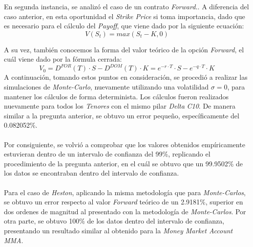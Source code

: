 \noindent En segunda instancia, se analizó el caso de un contrato \textit{Forward.}. A diferencia del caso anterior, en esta oportunidad el \textit{Strike Price} si toma importancia, dado que es necesario para el cálculo del \textit{Payoff}, que viene dado por la siguiente ecuación:
\begin{equation}
    V(S_t)=max(S_t-K,0)
\end{equation}

\noindent A su vez, también conocemos la forma del valor teórico de la opción \textit{Forward}, el cuál viene dado por la fórmula cerrada:
\begin{equation}
    V_0=D^{FOR}(T)\cdot S- D^{DOM}(T)\cdot K = e^{-r\cdot T}\cdot S- e^{-q\cdot T}\cdot K
\end{equation}
\noindent A continuación, tomando estos puntos en consideración, se procedió a realizar las simulaciones de \textit{Monte-Carlo}, nuevamente utilizando una volatilidad $\sigma=0$, para mantener los cálculos de forma determinista. Los cálculos fueron realizados nuevamente para todos los \textit{Tenores} con el mismo pilar \textit{Delta} \textit{C10}. De manera similar a la pregunta anterior, se obtuvo un error pequeño, específicamente del 0.082052\%.\\\\
\noindent Por consiguiente, se volvió a comprobar que los valores obtenidos empíricamente estuvieran dentro de un intervalo de confianza del 99\%, replicando el procedimiento de la pregunta anterior, en el cuál se obtuvo que un 99.9502\% de los datos se encontraban dentro del intervalo de confianza.\\\\
\noindent Para el caso de \textit{Heston}, aplicando la misma metodología que para \textit{Monte-Carlos}, se obtuvo un error respecto al valor \textit{Forward} teórico de un 2.9181\%, superior en dos ordenes de magnitud al presentado con la metodología de \textit{Monte-Carlos}. Por otra parte, se obtuvo 100\% de los datos dentro del intervalo de confianza, presentando un resultado similar al obtenido para la \textit{Money Market Account MMA}.
\newpage
